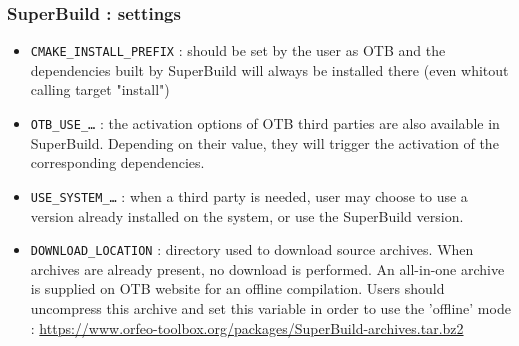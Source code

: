 \documentclass[8pt]{beamer}
\begin{document}
\begin{frame}
\frametitle{SuperBuild : settings}

\begin{itemize}
\item \texttt{CMAKE\_INSTALL\_PREFIX} : should be set by the user as OTB and the dependencies 
built by SuperBuild will always be installed there (even whitout calling target "install")  
\item \texttt{OTB\_USE\_\ldots} : the activation options of OTB third parties are also available 
in SuperBuild. Depending on their value, they will trigger the activation of the 
corresponding dependencies.
\item \texttt{USE\_SYSTEM\_\ldots} : when a third party is needed, user may choose to use a 
version already installed on the system, or use the SuperBuild version.
\item \texttt{DOWNLOAD\_LOCATION} : directory used to download source archives. When archives 
are already present, no download is performed. An all-in-one archive is supplied 
on OTB website for an offline compilation. Users should uncompress this archive 
and set this variable in order to use the 'offline' mode : 
\url{https://www.orfeo-toolbox.org/packages/SuperBuild-archives.tar.bz2}
\end{itemize}

\end{frame}
\end{document}
